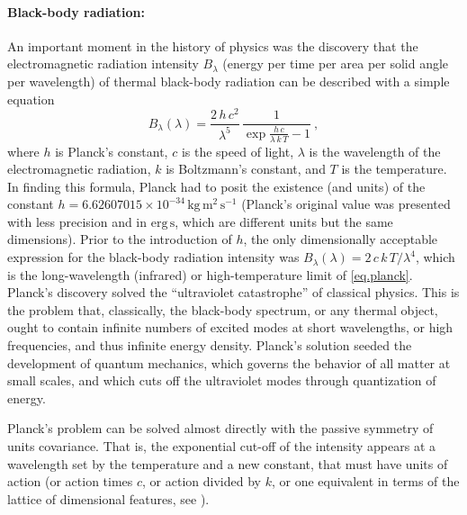 \documentclass[preprint]{article} %
\newcommand{\unit}[1]{\mathrm{#1}}
\newcommand{\kg}{\unit{kg}}
\newcommand{\m}{\unit{m}}
\newcommand{\s}{\unit{s}}
\begin{document}
\paragraph{Black-body radiation:}
An important moment in the history of physics was the discovery that the electromagnetic radiation intensity $B_\lambda$ (energy per time per area per solid angle per wavelength) of thermal black-body radiation can be described with a simple equation \citep{planck}
\begin{equation} \label{eq.planck}
    B_\lambda(\lambda) = \frac{2\,h\,c^2}{\lambda^5}\,\frac{1}{\exp\frac{h\,c}{\lambda\,k\,T} - 1}~,
\end{equation}
where $h$ is Planck's constant,
$c$ is the speed of light,
$\lambda$ is the wavelength of the electromagnetic radiation,
$k$ is Boltzmann's constant,
and $T$ is the temperature.
In finding this formula, Planck had to posit the existence (and units) of the constant $h=6.62607015\times 10^{-34}\,\kg\,\m^2\,\s^{-1}$ (Planck's original value was presented with less precision and in $\mathrm{erg}\,\s$, which are different units but the same dimensions).
Prior to the introduction of $h$, the only dimensionally acceptable expression for the black-body radiation intensity was $B_\lambda(\lambda)=2\,c\,k\,T/\lambda^4$, which is the long-wavelength (infrared) or high-temperature limit of \eqref{eq.planck}.
Planck's discovery solved the ``ultraviolet catastrophe'' of classical physics.
This is the problem that, classically, the black-body spectrum, or any thermal object, ought to contain infinite numbers of excited modes at short wavelengths, or high frequencies, and thus infinite energy density.
Planck's solution seeded the development of quantum mechanics, which governs the behavior of all matter at small scales, and which cuts off the ultraviolet modes through quantization of energy.

Planck's problem can be solved almost directly with the passive symmetry of units covariance.
That is, the exponential cut-off of the intensity appears at a wavelength set by the temperature and a new constant, that must have units of action (or action times $c$, or action divided by $k$, or one equivalent in terms of the lattice of dimensional features, see \citealt{villar2022dimensionless}).
\end{document}

